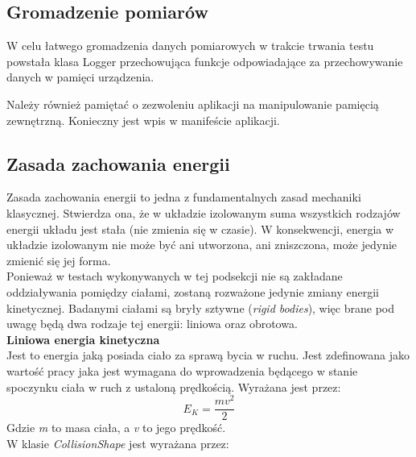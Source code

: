\subsection{Gromadzenie pomiarów}
W celu łatwego gromadzenia danych pomiarowych w trakcie trwania testu powstała
klasa Logger przechowująca funkcje odpowiadające za przechowywanie danych w
pamięci urządzenia.
  
Należy również pamiętać o zezwoleniu aplikacji na manipulowanie pamięcią
zewnętrzną. Konieczny jest wpis w manifeście aplikacji.


\subsection{Zasada zachowania energii}
Zasada zachowania energii to jedna z fundamentalnych zasad mechaniki klasycznej.
Stwierdza ona, że w układzie izolowanym suma wszystkich rodzajów energii układu
jest stała (nie zmienia się w czasie). W konsekwencji, energia w układzie
izolowanym nie może być ani utworzona, ani zniszczona, może jedynie zmienić się
jej forma.\\
Ponieważ w testach wykonywanych w tej podsekcji nie są zakładane
oddziaływania pomiędzy ciałami, zostaną rozważone jedynie zmiany energii
kinetycznej. Badanymi ciałami są bryły sztywne (\emph{rigid bodies}), więc brane
pod uwagę będą dwa rodzaje tej energii: liniowa oraz obrotowa.\\
\textbf{Liniowa energia kinetyczna}\\
Jest to energia jaką posiada ciało za sprawą bycia w ruchu. Jest zdefinowana
jako wartość pracy jaka jest wymagana do wprowadzenia będącego w stanie
spoczynku ciała w ruch z ustaloną prędkością. Wyrażana jest przez:
\begin{equation}
E_{K} = \frac{mv^{2}}{2}
\end{equation}
Gdzie \emph{m} to masa ciała, a \emph{v} to jego prędkość.\\
W klasie \emph{CollisionShape} jest wyrażana przez:



